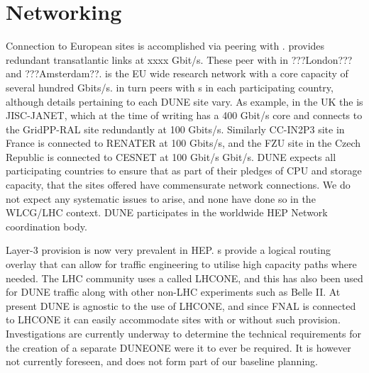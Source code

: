 \documentclass[../main-v1.tex]{subfiles}
\begin{document}
\chapter{Networking }
\label{ch:netw}





Connection to European sites is accomplished via  peering with .  
 provides redundant transatlantic links at xxxx Gbit/s. These peer with  in ???London??? and ???Amsterdam??.
 is the EU wide research network with a core capacity of several hundred Gbits/s.  in turn peers with s  in each participating country, although details pertaining to each DUNE site vary. As example, in the UK the  is JISC-JANET, which at the time of writing has a 400 Gbit/s core and connects to the GridPP-RAL site redundantly at 100 Gbits/s. 
Similarly CC-IN2P3 site in France is connected to RENATER at 100 Gbits/s, and the FZU site in the Czech Republic is connected to CESNET at 100 Gbit/s Gbit/s.  DUNE expects all participating countries to ensure that as part of their pledges of CPU and storage capacity, that the sites offered have commensurate network connections. We do not expect any systematic issues to arise, and none have done so in the WLCG/LHC context. DUNE participates in the worldwide HEP Network coordination body.

 Layer-3  provision is now very prevalent in HEP. s provide a logical routing overlay that can allow for traffic engineering to utilise high capacity paths where needed. The LHC community uses a  called LHCONE, and this has also been used for DUNE traffic along with other non-LHC experiments such as Belle II. 
At present DUNE is agnostic to the use of LHCONE, and since FNAL is connected to LHCONE it can easily accommodate sites with or without such provision.
Investigations are currently underway to determine the technical requirements for the creation of a separate DUNEONE  were it to ever be required. It is however not currently foreseen, and does not form part of our baseline planning.
\end{document}
